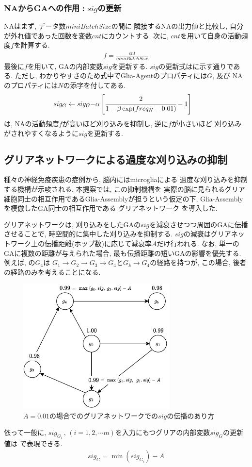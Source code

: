 \documentclass[a4paper, 10.5pt,twocolumn,dvipdfmx]{jsarticle}
\begin{document}
\subsubsection{NAからGAへの作用\,\,:\,\,$sig$の更新}
NAはまず, データ数$miniBatchSize$の間に
隣接するNAの出力値と比較し, 自分が外れ値であった回数を変数$cnt$にカウントする.
次に, $cnt$を用いて自身の活動頻度$f$を計算する.
\begin{align}
  f=\displaystyle\frac{cnt}{miniBatchSize}
\end{align}
最後に$f$を用いて, GAの内部変数$sig$を更新する.
$sig$の更新式はに示す通りである. 
ただし, わかりやすさのため式中でGlia-Agentのプロパティには$G$, 及び
NAのプロパティには$N$の添字を付してある.
\begin{align}
  sig_G\leftarrow sig_G-&\alpha\left[\cfrac{2}{1-\beta\exp(freq_N-0.01)}-1\right]
  \label{eq:sig}
\end{align}
は, NAの活動頻度$f$が高いほど刈り込みを抑制し, 逆に$f$が小さいほど
刈り込みがされやすくなるように$sig$を更新する.
\subsection{グリアネットワークによる過度な刈り込みの抑制}
種々の神経免疫疾患の症例から, 脳内にはmicrogliaによる
過度な刈り込みを抑制する機構が示唆される.
本提案では, この抑制機構を
実際の脳に見られるグリア細胞同士の相互作用であるGlia-Assemblyが担うという仮定の下,  
Glia-Assemblyを模倣したGA同士の相互作用である グリアネットワーク を導入した.

グリアネットワークは, 刈り込みをしたGAの$sig$を減衰させつつ周囲のGAに伝播させることで, 
時空間的に集中した刈り込みを抑制する. 
$sig$の減衰はグリアネットワーク上の伝播距離(ホップ数)に応じて減衰率$A$だけ行われる.
なお, 単一のGAに複数の距離が与えられた場合, 最も伝播距離の短いGAの影響を優先する.
例えば, の$G_4$は 
$G_1\rightarrow G_2\rightarrow G_3\rightarrow G_4$と$G_k\rightarrow G_4$の経路を持つが, 
この場合, 後者の経路のみを考えることになる.
\vspace{-1.5zh}
\begin{figure}[H]
  \centering
  \includegraphics[width=8cm]{GliaNetworks.pdf}
  \caption{$A=0.01$の場合でのグリアネットワークでの$sig$の伝播のあり方}
  \label{fig:GliaNetworks}
\end{figure}
\vspace{-2zh}
依って一般に, $sig_{G_i}\,,\,(i=1,2,\cdots m)$を入力にもつグリアの内部変数$sig_G$の更新値は
で表現できる.
\begin{align}
  sig_{G}=\min(sig_{G_i})-A
  \label{eq:tt}
\end{align}
\end{document}
